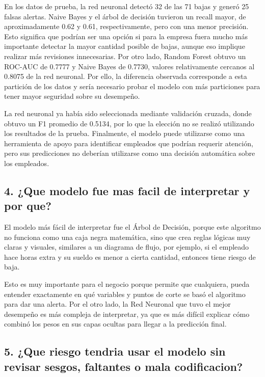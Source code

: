 \documentclass[letterpaper,11pt]{article}
\begin{document}
En los datos de prueba, la red neuronal detectó 32 de las 71 bajas y generó 25 falsas alertas. Naive Bayes y el árbol de decisión tuvieron un recall mayor, de aproximadamente 0.62 y 0.61, respectivamente, pero con una menor precisión. Esto significa que podrían ser una opción si para la empresa fuera mucho más importante detectar la mayor cantidad posible de bajas, aunque eso implique realizar más revisiones innecesarias. Por otro lado, Random Forest obtuvo un ROC-AUC de 0.7777 y Naive Bayes de 0.7730, valores relativamente cercanos al 0.8075 de la red neuronal. Por ello, la diferencia observada corresponde a esta partición de los datos y sería necesario probar el modelo con más particiones para tener mayor seguridad sobre su desempeño.

La red neuronal ya había sido seleccionada mediante validación cruzada, donde obtuvo un F1 promedio de 0.5134, por lo que la elección no se realizó utilizando los resultados de la prueba. Finalmente, el modelo puede utilizarse como una herramienta de apoyo para identificar empleados que podrían requerir atención, pero sus predicciones no deberían utilizarse como una decisión automática sobre los empleados.

\subsection*{4. ¿Que modelo fue mas facil de interpretar y por que?}

El modelo más fácil de interpretar fue el Árbol de Decisión, porque este algoritmo no funciona como una caja negra matemática, sino que crea reglas lógicas muy claras y visuales, similares a un diagrama de flujo, por ejemplo, si el empleado hace horas extra y su sueldo es menor a cierta cantidad, entonces tiene riesgo de baja.

Esto es muy importante para el negocio porque permite que cualquiera, pueda entender exactamente en qué variables y puntos de corte se basó el algoritmo para dar una alerta. Por el otro lado, la Red Neuronal que tuvo el mejor desempeño es más compleja de interpretar, ya que es más difícil explicar cómo combinó los pesos en sus capas ocultas para llegar a la predicción final.

\subsection*{5. ¿Que riesgo tendria usar el modelo sin revisar sesgos, faltantes o mala codificacion?}
\end{document}
